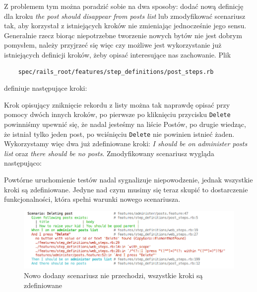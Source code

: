     Z problemem tym można poradzić sobie na dwa sposoby: dodać nową definicję dla kroku \emph{the post should disappear from posts list} lub zmodyfikować scenariusz tak, aby korzystał z istniejących kroków nie zmieniając jednocześnie jego sensu. Generalnie rzecz biorąc niepotrzebne tworzenie nowych bytów nie jest dobrym pomysłem, należy przyjrzeć się więc czy możliwe jest wykorzystanie już istniejących definicji kroków, żeby opisać interesujące nas zachowanie. Plik
    
    \begin{lstlisting}
    spec/rails_root/features/step_definitions/post_steps.rb
    \end{lstlisting}
    
    definiuje następujące kroki:
    
    
    
    Krok opisujący zniknięcie rekordu z listy można tak naprawdę opisać przy pomocy dwóch innych kroków, po pierwsze po kliknięciu przycisku \texttt{Delete} powinniśmy upewnić się, że nadal jesteśmy na liście Postów, po drugie wiedząc, że istniał tylko jeden post, po wciśnięciu \texttt{Delete} nie powinien istnieć żaden. Wykorzystamy więc dwa już zdefiniowane kroki: \emph{I should be on administer posts list} oraz \emph{there should be no posts}. Zmodyfikowany scenariusz wygląda następująco:
    
    
    
    Powtórne uruchomienie testów nadal sygnalizuje niepowodzenie, jednak wszystkie kroki są zdefiniowane. Jedyne nad czym musimy się teraz skupić to dostarczenie funkcjonalności, która spełni warunki nowego scenariusza.
     
     \clearpage
     
     \begin{figure}[!h]
   		\begin{center}
   			\includegraphics[width=\linewidth]{images/scenario_failure_2.png}
   			\caption{Nowo dodany scenariusz nie przechodzi, wszystkie kroki są zdefiniowane}
   			\label{scenario_failure_2}
   		\end{center}
   	\end{figure}
   	
